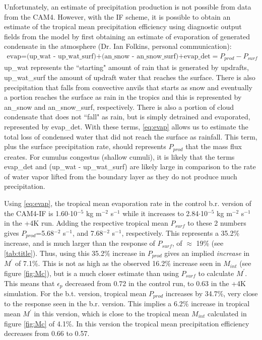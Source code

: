 \documentclass[letterpaper,12pt,titlepage,oneside,final]{book}
\begin{document}
Unfortunately, an estimate of precipitation production is not possible from data from the CAM4. However, with the IF scheme, it is possible to obtain an estimate of the tropical mean precipitation efficiency using diagnostic output fields from the model by first obtaining an estimate of evaporation of generated condensate in the atmosphere (Dr. Ian Folkins, personal communication):
\begin{align}\label{eq:evap}
\text{evap=(up\_wat - up\_wat\_surf)+(an\_snow - an\_snow\_surf)+evap\_det}=P_{prod}-P_{surf}
\end{align}
up\_wat represents the ``starting" amount of rain that is generated by updrafts, up\_wat\_surf the amount of updraft water that reaches the surface. There is also precipitation that falls from convective anvils that starts as snow and eventually a portion reaches the surface as rain in the tropics and this is represented by an\_snow and an\_snow\_surf, respectively. There is also a portion of cloud condensate that does not ``fall" as rain, but is simply detrained and evaporated, represented by evap\_det. With these terms, \ref{eq:evap} allows us to estimate the total loss of condensed water that did not reach the surface as rainfall. This term, plus the surface precipitation rate, should represents $P_{prod}$ that the mass flux creates. For cumulus congestus (shallow cumuli), it is likely that the terms evap\_det and (up\_wat - up\_wat\_surf) are likely large in comparison to the rate of water vapor lifted from the boundary layer as they do not produce much precipitation.

Using \ref{eq:evap}, the tropical mean evaporation rate in the control b.r. version of the CAM4-IF is 1.60$\cdot$10$^{-5}$ kg m$^{-2}$ s$^{-1}$ while it increases to 2.84$\cdot$10$^{-5}$ kg m$^{-2}$ s$^{-1}$ in the +4K run. Adding the respective tropical mean $P_{surf}$ to these 2 numbers gives $P_{prod}$=5.68$^{-2}$ s$^{-1}$, and 7.68$^{-2}$ s$^{-1}$, respectively. This represents a 35.2\% increase, and is much larger than the response of $P_{surf}$, of $\approx$ 19\% (see \ref{tab:title}). Thus, using this 35.2\% increase in $P_{prod}$ gives an implied \textit{increase} in $M^{'}$ of 7.1\%. This is not as high as the observed 16.2\% increase seen in $M_{int}$ (see figure \ref{fig:Mc}), but is a much closer estimate than using $P_{surf}$ to calculate $M^{'}$. This means that $\epsilon_{p}$ decreased from 0.72 in the control run, to 0.63 in the +4K simulation. For the b.t. version, tropical mean $P_{prod}$ increases by 34.7\%, very close to the response seen in the b.r. version. This implies a 6.2\% increase in tropical mean $M^{'}$ in this version, which is close to the tropical mean $M_{int}$ calculated in figure \ref{fig:Mc} of 4.1\%. In this version the tropical mean precipitation efficiency decreases from 0.66 to 0.57.
\end{document}
